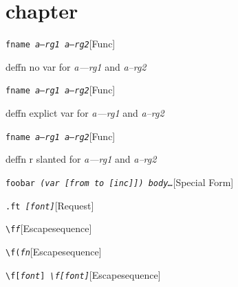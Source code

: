 \documentclass{book}
\begin{document}
\label{anchor:Top}%
\chapter{chapter}
\label{anchor:chapter}%

\noindent\texttt{fname \bgroup{}\normalfont{}\textsl{a---rg1 a--rg2}\egroup{}}\hfill[Func]



%
deffn no var for \textsl{a---rg1} and \textsl{a--rg2}

\noindent\texttt{fname \bgroup{}\normalfont{}\textsl{\textsl{a---rg1} \textsl{a--rg2}}\egroup{}}\hfill[Func]



%
deffn explict var for \textsl{a---rg1} and \textsl{a--rg2}

\noindent\texttt{fname \bgroup{}\normalfont{}\textsl{\textnormal{\textsl{a---rg1}} \textnormal{\textsl{a--rg2}}}\egroup{}}\hfill[Func]



%
deffn r slanted for \textsl{a---rg1} and \textsl{a--rg2}

\noindent\texttt{foobar \bgroup{}\normalfont{}\textsl{(var {[}from to {[}inc{]}{]}) body\dots{}\@}\egroup{}}\hfill[Special Form]



%

\noindent\texttt{\texttt{.ft} \bgroup{}\normalfont{}\textsl{{[}\textnormal{\textsl{font}}{]}}\egroup{}}\hfill[Request]



%
\noindent\texttt{\texttt{\textbackslash{}f}\textnormal{\textsl{f}}\texttt{}}\hfill[Escape\hbox{}sequence]



%
\noindent\texttt{\texttt{\textbackslash{}f(}\textnormal{\textsl{fn}}\texttt{}}\hfill[Escape\hbox{}sequence]



%
\noindent\texttt{\texttt{\textbackslash{}f{[}}\textnormal{\textsl{font}}\texttt{{]}} \bgroup{}\normalfont{}\textsl{\texttt{\textbackslash{}f{[}}\textnormal{\textsl{font}}\texttt{{]}}}\egroup{}}\hfill[Escape\hbox{}sequence]
\end{document}
